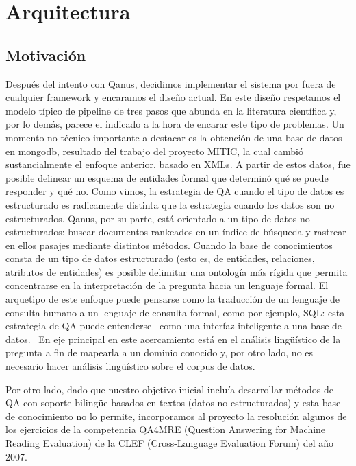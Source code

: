 \bigskip

\section{Arquitectura}

\subsection{Motivación}

Después del intento con Qanus, decidimos implementar el sistema por
fuera de cualquier framework y encaramos el dise\~no actual. En este
dise\~no respetamos el modelo típico de pipeline de tres pasos que
abunda en la literatura científica y, por lo demás, parece el
indicado a la hora de encarar este tipo de problemas. Un momento no-técnico
importante a destacar es la obtención de una base de datos en
mongodb, resultado del trabajo del proyecto MITIC, la cual cambió
sustancialmente el enfoque anterior, basado en XMLs. 
A partir de estos datos, fue posible delinear un esquema de entidades formal que determinó
qué se puede responder y qué no. Como vimos, la estrategia de QA
cuando el tipo de datos es estructurado es radicamente distinta que la
estrategia cuando los datos son no estructurados. Qanus, por su parte,
está orientado a un tipo de datos no estructurados: buscar documentos
rankeados en un índice de búsqueda y rastrear en ellos pasajes
mediante distintos métodos. Cuando la base de conocimientos consta de
un tipo de datos estructurado (esto es, de entidades, relaciones,
atributos de entidades) es posible delimitar una ontología más
rígida que permita concentrarse en la interpretación de la pregunta
hacia un lenguaje formal. El arquetipo de este enfoque puede pensarse
como la traducción de un lenguaje de consulta humano a un lenguaje de
consulta formal, como por ejemplo, SQL: esta estrategia de QA puede
entenderse \ como una interfaz inteligente a una base de datos. \ En
eje principal en este acercamiento está en el análisis
lingüístico de la pregunta a fin de mapearla a un dominio conocido
y, por otro lado, no es necesario hacer análisis lingüístico
sobre el corpus de datos.

Por otro lado, dado que nuestro objetivo inicial incluía desarrollar
métodos de QA con soporte bilingüe basados en textos (datos no estructurados) 
y esta base de conocimiento no lo permite, incorporamos al proyecto la resolución
algunos de los ejercicios de la competencia QA4MRE (Question Answering for Machine Reading Evaluation)
de la CLEF (Cross-Language Evaluation Forum) del a\~no 2007. 

